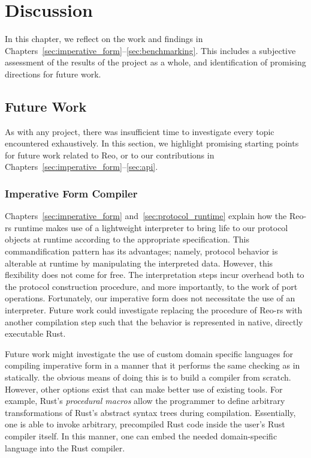 \chapter{Discussion}
In this chapter, we reflect on the work and findings in Chapters~\ref{sec:imperative_form}--\ref{sec:benchmarking}. This includes a subjective assessment of the results of the project as a whole, and identification of promising directions for future work.

\label{sec:discussion}
\section{Future Work}
As with any project, there was insufficient time to investigate every topic encountered exhaustively. In this section, we highlight promising starting points for future work related to Reo, or to our contributions in Chapters~\ref{sec:imperative_form}--\ref{sec:api}.

\subsection{Imperative Form Compiler}
\label{sec:future_imperative_compiler}
Chapters~\ref{sec:imperative_form} and~\ref{sec:protocol_runtime} explain how the Reo-rs runtime makes use of a lightweight interpreter to bring life to our protocol objects at runtime according to the appropriate specification. This commandification pattern has its advantages; namely, protocol behavior is alterable at runtime by manipulating the interpreted data. However, this flexibility does not come for free. The interpretation steps incur overhead both to the protocol construction procedure, and more importantly, to the work of port operations. Fortunately, our imperative form does not necessitate the use of an interpreter. Future work could investigate replacing the  procedure of Reo-rs with another compilation step such that the behavior is represented in native, directly executable Rust. 

Future work might investigate the use of custom domain specific languages for compiling imperative form in a manner that it performs the same checking as in  statically. the obvious means of doing this is to build a compiler from scratch. However, other options exist that can make better use of existing tools. For example, Rust's \textit{procedural macros} allow the programmer to define arbitrary transformations of Rust's abstract syntax trees during compilation. Essentially, one is able to invoke arbitrary, precompiled Rust code inside the user's Rust compiler itself. In this manner, one can embed the needed domain-specific language into the Rust compiler.

